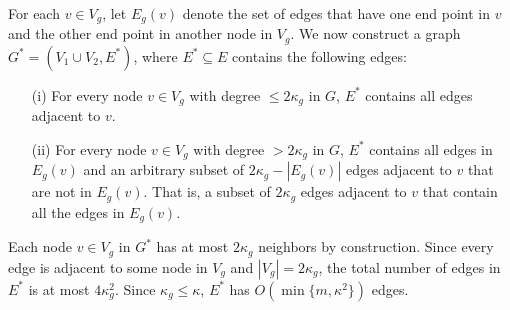 \documentclass{article}
\begin{document}
For each $v \in V_g$, let $E_g(v)$ denote the set of edges that have one end point in $v$ and the other end point in another node in $V_g$.  We now construct a graph $G^* = (V_1 \cup V_2, E^*)$, where $E^* \subseteq E$ contains the following edges:
\begin{enumerate}
\item [(i)] For every node $v \in V_g$ with degree $\leq 2 \kappa_g$ in $G$, $E^*$ contains all edges adjacent to $v$.
\item [(ii)]  For every node $v \in V_g$ with degree $ > 2 \kappa_g$ in $G$, $E^*$ contains all edges in $E_g(v)$ and an arbitrary subset of $2 \kappa_g - |E_g(v)|$ edges adjacent to $v$ that are not in $E_g(v)$. That is, a subset of $2 \kappa_g$ edges adjacent to $v$ that contain all the edges in $E_g(v)$.
\end{enumerate}

\noindent Each node $v \in V_g$ in $G^*$ has at most $2\kappa_g$ neighbors by construction. Since every edge is adjacent to some node in $V_g$ and $|V_g| = 2 \kappa_g$, the total number of edges in $E^*$ is at most $4 \kappa_g^2$. Since $\kappa_g \leq \kappa$, $E^*$ has $O(\min\{m, \kappa^2\})$ edges.
\end{document}
